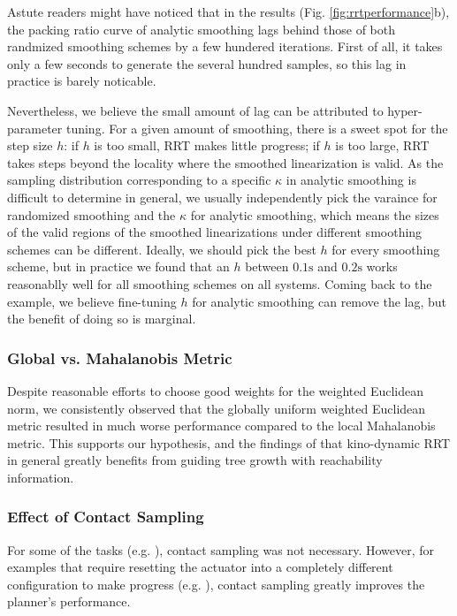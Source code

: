 Astute readers might have noticed that in the  results (Fig. \ref{fig:rrtperformance}b), the packing ratio curve of analytic smoothing lags behind those of both randmized smoothing schemes by a few hundered iterations. First of all, it takes only a few seconds to generate the several hundred samples, so this lag in practice is barely noticable. 

Nevertheless, we believe the small amount of lag can be attributed to hyper-parameter tuning. For a given amount of smoothing, there is a sweet spot for the step size $h$: if $h$ is too small, RRT makes little progress; if $h$ is too large, RRT takes steps beyond the locality where the smoothed linearization is valid. As the sampling distribution corresponding to a specific $\kappa$ in analytic smoothing is difficult to determine in general,  we usually independently pick the varaince for randomized smoothing and the $\kappa$ for analytic smoothing, which means the sizes of the valid regions of the smoothed linearizations under different smoothing schemes can be different. Ideally, we should pick the best $h$ for every smoothing scheme, but in practice we found that an $h$ between $0.1\mathrm{s}$ and $0.2\mathrm{s}$ works reasonablly well for all smoothing schemes on all systems. Coming back to the  example, we believe fine-tuning $h$ for analytic smoothing can remove the lag, but the benefit of doing so is marginal. 

\subsubsection{Global vs. Mahalanobis Metric} Despite reasonable efforts to choose good weights for the weighted Euclidean norm, we consistently observed that the globally uniform weighted Euclidean metric resulted in much worse performance compared to the local Mahalanobis metric. This supports our hypothesis, and the findings of \cite{shkolnik2009reachability} that kino-dynamic RRT in general greatly benefits from guiding tree growth with reachability information. 

\subsubsection{Effect of Contact Sampling} For some of the tasks (e.g. ), contact sampling was not necessary. However, for examples that require resetting the actuator into a completely different configuration to make progress (e.g. ), contact sampling greatly improves the planner's performance. 




